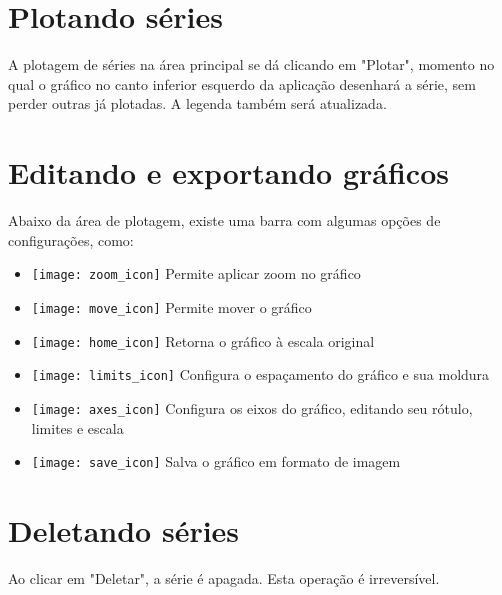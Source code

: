 \section{Plotando séries}

A plotagem de séries na área principal se dá clicando em "Plotar", momento no qual o gráfico no canto inferior esquerdo da aplicação desenhará a série, sem perder outras já plotadas. A legenda também será atualizada.

\section{Editando e exportando gráficos}

Abaixo da área de plotagem, existe uma barra com algumas opções de configurações, como:

\begin{itemize}
	\item \texttt{[image: zoom\_icon]} Permite aplicar zoom no gráfico
	\item \texttt{[image: move\_icon]} Permite mover o gráfico
	\item \texttt{[image: home\_icon]} Retorna o gráfico à escala original
	\item \texttt{[image: limits\_icon]} Configura o espaçamento do gráfico e sua moldura
	\item \texttt{[image: axes\_icon]} Configura os eixos do gráfico, editando seu rótulo, limites e escala
	\item \texttt{[image: save\_icon]} Salva o gráfico em formato de imagem
\end{itemize}

\section{Deletando séries}

Ao clicar em "Deletar", a série é apagada. Esta operação é irreversível.